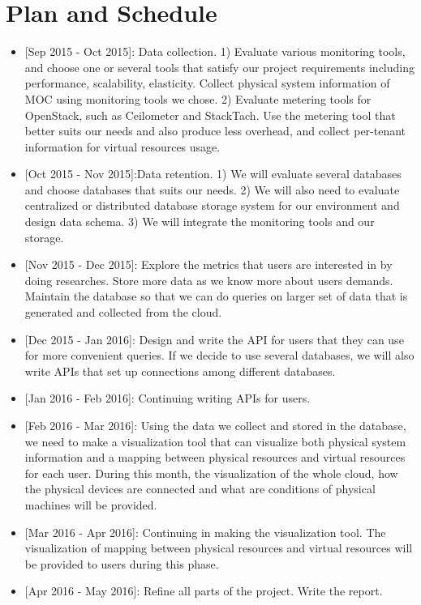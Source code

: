 \section{Plan and Schedule}
\label{sec:Plan}

\begin{itemize}
\item{[Sep 2015 - Oct 2015]:} Data collection. 1) Evaluate various monitoring tools, and choose one or several tools that satisfy our project requirements including performance, scalability, elasticity. Collect physical system information of MOC using monitoring tools we chose. 2) Evaluate metering tools for OpenStack, such as Ceilometer and StackTach. Use the metering tool that better suits our needs and also produce less overhead, and collect per-tenant information for virtual resources usage. 
\item{[Oct 2015 - Nov 2015]:}Data retention. 1) We will evaluate several databases and choose databases that suits our needs. 2) We will also need to evaluate centralized or distributed database storage system for our environment and design data schema. 3) We will integrate the monitoring tools and our storage.
\item{[Nov 2015 - Dec 2015]:} Explore the metrics that users are interested in by doing researches. Store more data as we know more about users demands. Maintain the database so that we can do queries on larger set of data that is generated and collected from the cloud. 
\item{[Dec 2015 - Jan 2016]:} Design and write the API for users that they can use for more convenient queries. If we decide to use several databases, we will also write APIs that set up connections among different databases. 
\item{[Jan 2016 - Feb 2016]:} Continuing writing APIs for users.  
\item{[Feb 2016 - Mar 2016]:} Using the data we collect and stored in the database, we need to make a visualization tool that can visualize both physical system information and a mapping between physical resources and virtual resources for each user. During this month, the visualization of the whole cloud, how the physical devices are connected and what are conditions of physical machines will be provided.  
\item{[Mar 2016 - Apr 2016]:} Continuing in making the visualization tool. The visualization of mapping between physical resources and virtual resources will be provided to users during this phase.  
\item{[Apr 2016 - May 2016]:} Refine all parts of the project. Write the report.
\end{itemize}
